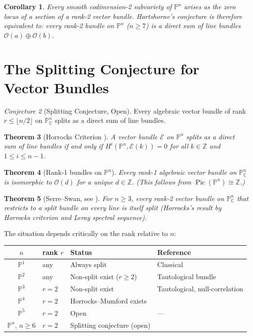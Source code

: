 \documentclass[12pt,a4paper]{amsart}
\newtheorem{theorem}{Theorem}[section]
\newtheorem{corollary}[theorem]{Corollary}
\theoremstyle{definition}
\theoremstyle{remark}
\newtheorem{conjecture}[theorem]{Conjecture}
\DeclareMathOperator{\Pic}{Pic}
\newcommand{\PP}{\mathbb{P}}
\newcommand{\ZZ}{\mathbb{Z}}
\newcommand{\CC}{\mathbb{C}}
\newcommand{\OO}{\mathcal{O}}
\begin{document}
\begin{corollary}
Every smooth codimension-2 subvariety of $\PP^n$ arises as the zero locus
of a section of a rank-2 vector bundle.  Hartshorne's conjecture is therefore
equivalent to: every rank-2 bundle on $\PP^n$ ($n \ge 7$) is a direct sum
of line bundles $\OO(a) \oplus \OO(b)$.
\end{corollary}

\section{The Splitting Conjecture for Vector Bundles}

\begin{conjecture}[Splitting Conjecture, Open]
\label{conj:splitting}
Every algebraic vector bundle of rank $r \le \lfloor n/2 \rfloor$ on
$\PP^n_\CC$ splits as a direct sum of line bundles.
\end{conjecture}

\begin{theorem}[Horrocks Criterion \cite{Horrocks1964}]
A vector bundle $\mathcal{E}$ on $\PP^n$ splits as a direct sum of line bundles
if and only if $H^i(\PP^n, \mathcal{E}(k)) = 0$ for all $k \in \ZZ$ and
$1 \le i \le n-1$.
\end{theorem}

\begin{theorem}[Rank-1 bundles on $\PP^n$]
Every rank-1 algebraic vector bundle on $\PP^n_\CC$ is isomorphic to
$\OO(d)$ for a unique $d \in \ZZ$.  (This follows from $\Pic(\PP^n) \cong \ZZ$.)
\end{theorem}

\begin{theorem}[Serre--Swan, see \cite{Hartshorne1977}]
For $n \ge 3$, every rank-2 vector bundle on $\PP^n_\CC$ that restricts to
a split bundle on every line is itself split (Horrocks's result by Horrocks
criterion and Leray spectral sequence).
\end{theorem}

The situation depends critically on the rank relative to $n$:

\begin{center}
\begin{tabular}{clll}
\toprule
$n$ & rank $r$ & Status & Reference \\
\midrule
$\PP^1$ & any & Always split & Classical \\
$\PP^2$ & any & Non-split exist ($r \ge 2$) & Tautological bundle \\
$\PP^3$ & $r=2$ & Non-split exist & Tautological, null-correlation \\
$\PP^4$ & $r=2$ & Horrocks--Mumford exists & \cite{HorrocksMumford1973} \\
$\PP^5$ & $r=2$ & Open & --- \\
$\PP^n$, $n \ge 6$ & $r=2$ & Splitting conjecture (open) & \cite{Hartshorne1974} \\
\bottomrule
\end{tabular}
\end{center}
\end{document}
